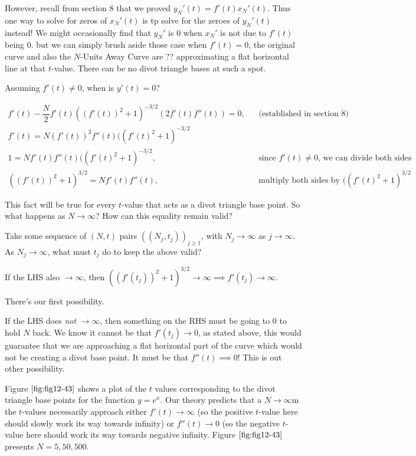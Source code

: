 However, recall from section 8 that we proved $y_N'(t) = f'(t) x_N'(t)$. Thus one way to solve for zeros of $x_N'(t)$ is tp solve for the zeroes of $y_N'(t)$ instead! We might occasionally find that $y_N'$ is 0 when $x_N'$ is not due to $f'(t)$ being 0. but we can simply brush aside those case when $f'(t) = 0$, the original curve and also the $N$-Units Away Curve are ?? approximating a flat horizontal line at that $t$-value. There can be no divot triangle bases at such a spot.

Assuming $f'(t) \neq 0$, when is $y'(t) = 0$?

\begin{align*}
    f'(t) - \dfrac{N}{2} f'(t) ((f'(t))^2 + 1) ^ {-3/2} (2 f'(t) f''(t)) = 0, && \text{(established in section 8)} \\
    f'(t) = N(f'(t))^2 f''(t)((f'(t)^2+1)^{-3/2} \\
    1 = N f'(t) f''(t) ((f'(t)^2 + 1) ^ {-3/2}, && \text{since $f'(t) \neq 0$, we can divide both sides by it} \\
    ((f'(t))^2 + 1) ^ {3 / 2} = N f'(t) f''(t), && \text{multiply both sides by $((f'(t) ^ 2 + 1) ^ {3 / 2}$}
\end{align*}

This fact will be true for every $t$-value that acts as a divot triangle base point. So what happens as $N \xrightarrow{} \infty$? How can this equality remain valid?

Take some sequence of $(N, t)$ pairs $((N_j, t_j))_{ j \geq 1}$, with $N_j \xrightarrow{} \infty$ as $j \xrightarrow{} \infty$. As $N_j \xrightarrow{} \infty$, what must $t_j$ do to keep the above valid?

If the LHS also $\xrightarrow{} \infty$, then $((f'(t_j))^2 + 1) ^ {3/2} \xrightarrow{} \infty \implies f'(t_j) \xrightarrow{} \infty$.

There's our first possibility.

If the LHS does \textit{not} $\xrightarrow{} \infty$, then something on the RHS must be going to 0 to hold $N$ back. We know it cannot be that $f'(t_j) \xrightarrow{} 0$, as stated above, this would guarantee that we are approaching a flat horizontal part of the curve which would not be creating a divot base point. It must be that $f''(t) \implies 0$! This is out other possibility.

Figure $\ref{fig:fig12-43}$ shows a plot of the $t$ values corresponding to the divot triangle base points for the function $y = e^x$. Our theory predicts that a $N \xrightarrow{} \infty$m the $t$-values necessarily approach either $f'(t) \xrightarrow{} \infty$ (so the positive $t$-value here should slowly work its way towards infinity) or $f''(t) \xrightarrow{} 0$ (so the negative $t$-value here should work its way towards negative infinity. Figure $\ref{fig:fig12-43}$ presents $N = 5, 50, 500$.

